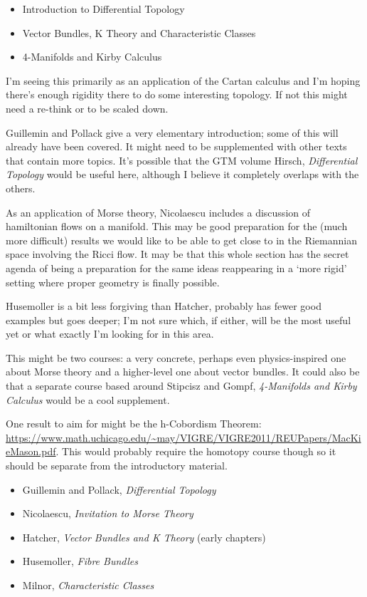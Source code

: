 \documentclass[article]{article}
\begin{document}
\begin{itemize}
	\item{Introduction to Differential Topology}
	\item{Vector Bundles, K Theory and Characteristic Classes}
	\item{4-Manifolds and Kirby Calculus}
\end{itemize}

I'm seeing this primarily as an application of the Cartan calculus and I'm hoping there's enough rigidity there to do some interesting topology. If not this might need a re-think or to be scaled down.

Guillemin and Pollack give a very elementary introduction; some of this will already have been covered. It might need to be supplemented with other texts that contain more topics. It's possible that the GTM volume Hirsch, \textit{Differential Topology} would be useful here, although I believe it completely overlaps with the others.

As an application of Morse theory, Nicolaescu includes a discussion of hamiltonian flows on a manifold. This may be good preparation for the (much more difficult) results we would like to be able to get close to in the Riemannian space involving the Ricci flow. It may be that this whole section has the secret agenda of being a preparation for the same ideas reappearing in a `more rigid' setting where proper geometry is finally possible.

Husemoller is a bit less forgiving than Hatcher, probably has fewer good examples but goes deeper; I'm not sure which, if either, will be the most useful yet or what exactly I'm looking for in this area.

This might be two courses: a very concrete, perhaps even physics-inspired one about Morse theory and a higher-level one about vector bundles. It could also be that a separate course based around Stipcisz and Gompf, \textit{4-Manifolds and Kirby Calculus} would be a cool supplement.


One result to aim for might be the h-Cobordism Theorem: \url{https://www.math.uchicago.edu/~may/VIGRE/VIGRE2011/REUPapers/MacKieMason.pdf}. This would probably require the homotopy course though so it should be separate from the introductory material.

\begin{itemize}
	\item[]{Guillemin and Pollack, \textit{Differential Topology}}
	\item[]{Nicolaescu, \textit{Invitation to Morse Theory}}
	\item[]{Hatcher, \textit{Vector Bundles and K Theory} (early chapters)}
	\item[]{Husemoller, \textit{Fibre Bundles}}
	\item Milnor, \textit{Characteristic Classes}
\end{itemize}
\end{document}
